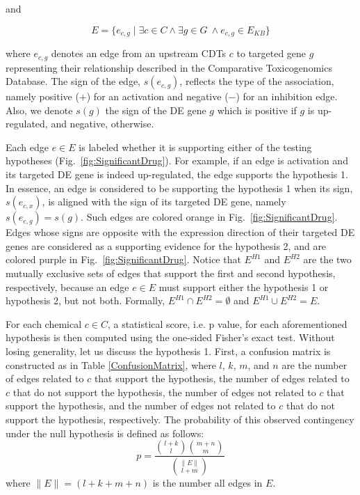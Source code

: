 and 

\begin{equation} E = \{ e_{c,g} \mid \exists c \in C \land  \exists g \in G \ \land  e_{c,g} \in E_{KB} \} \end{equation}


where $e_{c,g}$ denotes an edge from an upstream CDTs $c$ to targeted gene $g$ representing their relationship described in the Comparative Toxicogenomics Database. The sign of the edge, $s(e_{c,g})$, reflects the type of the association, namely positive ($+$) for an activation and negative ($-$) for an inhibition edge. Also, we denote $s(g)$ the sign of the DE gene $g$ which is positive if $g$ is up-regulated, and negative, otherwise. 

Each edge $e \in E$ is labeled whether it is supporting either of the testing hypotheses (Fig.~\ref{fig:SignificantDrug}). 
For example, if an edge is activation and its targeted DE gene is indeed up-regulated, the edge supports the hypothesis 1. 
In essence, an edge is considered to be supporting the hypothesis 1 when its sign, $s(e_{c,x})$, is aligned with the sign of its targeted DE gene, namely $s(e_{c,g}) = s(g)$. 
Such edges are colored orange in Fig.~\ref{fig:SignificantDrug}. 
Edges whose signs are opposite with the expression direction of their targeted DE genes are considered as a supporting evidence for the hypothesis 2, and are colored purple in  Fig.~\ref{fig:SignificantDrug}. 
Notice that $E^{H1}$ and $E^{H2}$ are the two mutually exclusive sets of edges that support the first and second hypothesis, respectively, because an edge $e \in E$ must support either the hypothesis 1 or hypothesis 2, but not both. Formally, $E^{H1} \cap E^{H2} = \emptyset$ and  $E^{H1} \cup E^{H2} = E$. 

For each chemical $c \in C$, a statistical score, i.e. p value, for each aforementioned hypothesis is then computed using the one-sided Fisher's exact test. Without losing generality, let us discuss the hypothesis 1. First, a confusion matrix is constructed as in Table \ref{ConfusionMatrix}, where $l$, $k$, $m$, and $n$ are the number of edges related to $c$ that support the hypothesis, the number of edges related to $c$ that do not support the hypothesis, the number of edges not related to $c$ that support the hypothesis, and the number of edges not related to $c$ that do not support the hypothesis, respectively. 
The probability of this observed contingency under the null hypothesis is defined as follows:
\begin{equation}
p = \frac{ {l+k \choose l}{m+n \choose m}}{{\|E\| \choose l + m}}
\end{equation}
where $\|E\| = (l+k+m+n)$ is the number all edges in $E$. 

